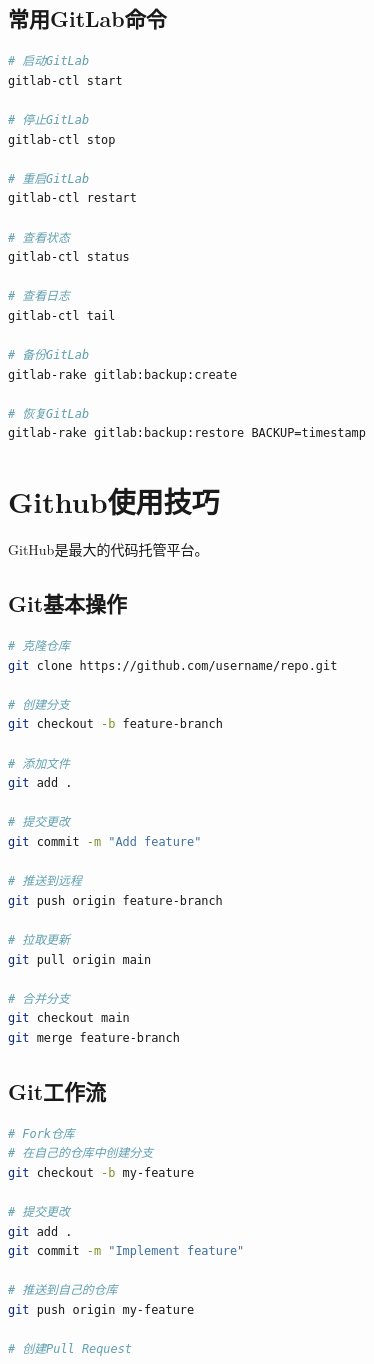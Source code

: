 \documentclass[12pt,UTF8]{ctexbook}
\begin{document}
\subsection*{常用GitLab命令}
\begin{lstlisting}[language=bash]
# 启动GitLab
gitlab-ctl start

# 停止GitLab
gitlab-ctl stop

# 重启GitLab
gitlab-ctl restart

# 查看状态
gitlab-ctl status

# 查看日志
gitlab-ctl tail

# 备份GitLab
gitlab-rake gitlab:backup:create

# 恢复GitLab
gitlab-rake gitlab:backup:restore BACKUP=timestamp
\end{lstlisting}

\section{Github使用技巧}
\label{sec:github}

GitHub是最大的代码托管平台。

\subsection*{Git基本操作}
\begin{lstlisting}[language=bash]
# 克隆仓库
git clone https://github.com/username/repo.git

# 创建分支
git checkout -b feature-branch

# 添加文件
git add .

# 提交更改
git commit -m "Add feature"

# 推送到远程
git push origin feature-branch

# 拉取更新
git pull origin main

# 合并分支
git checkout main
git merge feature-branch
\end{lstlisting}

\subsection*{Git工作流}
\begin{lstlisting}[language=bash]
# Fork仓库
# 在自己的仓库中创建分支
git checkout -b my-feature

# 提交更改
git add .
git commit -m "Implement feature"

# 推送到自己的仓库
git push origin my-feature

# 创建Pull Request
\end{lstlisting}
\end{document}
